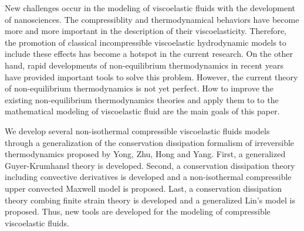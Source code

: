 \begin{eabstract}
  \noindent New challenges occur in the modeling of viscoelastic fluids with the development of nanosciences. The compressiblity and thermodynamical behaviors have become more and more important in the description of their viscoelasticity. Therefore, the promotion of classical incompressible viscoelastic hydrodynamic models to include these effects has become a hotspot in the current research. On the other hand, rapid developments of non-equilibrium thermodynamics in recent years have provided important tools to solve this problem. However, the current theory of non-equilibrium thermodynamics is not yet perfect. How to improve the existing non-equilibrium thermodynamics theories and apply them to to the mathematical modeling of viscoelastic fluid are the main goals of this paper.

  
 We develop several non-isothermal compressible viscoelastic fluids models through a generalization of the conservation dissipation formalism of irreversible thermodynamics proposed by Yong, Zhu, Hong and Yang. First, a generalized Guyer-Krumhansl theory is developed. Second, a conservation dissipation theory including convective derivatives is developed and a non-isothermal compressible upper convected Maxwell model is proposed. Last, a conservation dissipation theory combing finite strain theory is developed and a generalized Lin's model is proposed. Thus, new tools are developed for the modeling of compressible viscoelastic fluids.



\end{eabstract}
